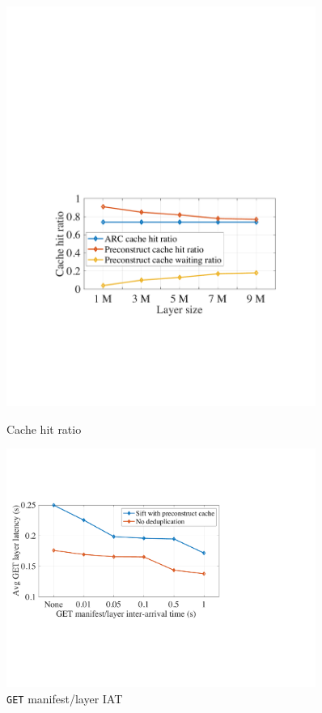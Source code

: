 \begin{figure}[t]
\begin{minipage}{0.3\textwidth}
		\includegraphics[width=0.9\textwidth]{graphs/cachehitratio.pdf}
		\caption{Cache hit ratio}%
		\label{fig:eval-cachehitratios}
	\end{minipage}%
	\begin{minipage}{0.3\textwidth}
	\centering
	\includegraphics[width=0.9\textwidth]{graphs/durationML.pdf}
	\caption{\texttt{GET} manifest/layer IAT 
	}
	\label{fig:eval-durationML}
   \end{minipage}
\end{figure}


